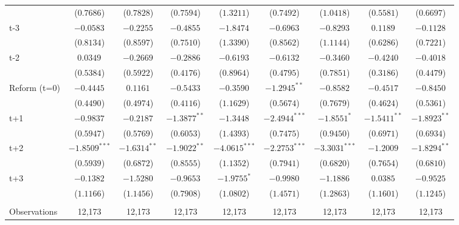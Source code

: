 \begin{landscape}
\begin{table}[htbp]
{\begin{tabular}{lcccccccc}
&     ($0.7686$) &     ($0.7828$) & ($0.7594$)& ($ 1.3211$)  &    ($0.7492$)   &   ($1.0418$) &    ($0.5581$)   &   ($0.6697$) \\
t-3 &     $ -0.0583^{} $ &     $ -0.2255^{} $ &  $ -0.4855^{} $  &  $ -1.8474^{} $  &     $ -0.6963^{} $ &     $ -0.8293^{} $ & $ 0.1189^{} $ & $ -0.1128^{} $   \\
&     ($0.8134$) &     ($0.8597$) & ($0.7510$)& ($ 1.3390$)  &    ($0.8562$)   &   ($1.1144$) &    ($0.6286$)   &   ($0.7221$) \\
t-2 &     $ 0.0349^{} $ &     $ -0.2669^{} $ &  $ -0.2886^{} $  &  $ -0.6193^{} $  &     $ -0.6132^{} $ &     $ -0.3460^{} $ & $ -0.4240^{} $ & $ -0.4018^{} $   \\
&     ($0.5384$) &     ($0.5922$) & ($0.4176$)& ($ 0.8964$)  &    ($0.4795$)   &   ($0.7851$) &    ($0.3186$)   &   ($0.4479$) \\
Reform (t=0) &     $ -0.4445^{} $ &     $ 0.1161^{} $ &   $ -0.5433^{} $   &   $ -0.3590^{} $  &     $ -1.2945^{**} $ &     $ -0.8582^{} $ & $ -0.4517^{} $ & $ -0.8450^{} $   \\
&     ($0.4490$) &     ($0.4974$) & ($0.4116$)& ($ 1.1629$)  &    ($0.5674$)   &   ($0.7679$) &    ($0.4624$)   &   ($0.5361$) \\
t+1 &     $ -0.9837^{} $ &     $ -0.2187^{} $ &    $ -1.3877^{**} $ &    $ -1.3448^{} $ &     $ -2.4944^{***} $ &     $ -1.8551^{*} $  & $ -1.5411^{**} $ & $ -1.8923^{**} $   \\
&     ($0.5947$) &     ($0.5769$) & ($0.6053$)& ($ 1.4393$)  &    ($0.7475$)   &   ($0.9450$) &    ($0.6971$)   &   ($0.6934$) \\
t+2 &     $ -1.8509^{***} $ &     $ -1.6314^{**} $ &    $ -1.9022^{**} $ &    $ -4.0615^{***} $ &     $ -2.2753^{***} $ &     $ -3.3031^{***} $  & $ -1.2009^{} $ & $ -1.8294^{**} $   \\
&     ($0.5939$) &     ($0.6872$) & ($0.8555$)& ($ 1.1352$)  &    ($0.7941$)   &   ($0.6820$) &    ($0.7654$)   &   ($0.6810$) \\
t+3 &     $ -0.1382^{} $ &     $ -1.5280^{} $ &    $ -0.9653^{} $ &    $ -1.9755^{*} $ &     $ -0.9980^{} $ &     $ -1.1886^{} $  & $ 0.0385^{} $ & $ -0.9525^{} $   \\
&     ($1.1166$) &     ($1.1456$) & ($0.7908$)& ($ 1.0802$)  &    ($1.4571$)   &   ($1.2863$) &    ($1.1601$)   &   ($1.1245$) \\
\\
\addlinespace
Observations       &             12,173    &             12,173    &          12,173      &          12,173  &             12,173    &             12,173  &             12,173    &             12,173   \\

\end{tabular}}
\end{table}
\end{landscape}
